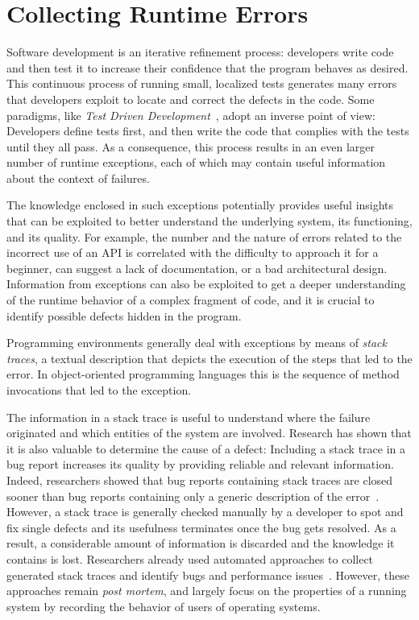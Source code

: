 \section{Collecting Runtime Errors} \label{sec:stacktraces-intro}

Software development is an iterative refinement process: developers write code and then test it to increase their confidence that the program behaves as desired.
This continuous process of running small, localized tests generates many errors that developers exploit to locate and correct the defects in the code.
Some paradigms, like \emph{Test Driven Development}~\cite{BeckTDD}, adopt an inverse point of view: Developers define tests first, and then write the code that complies with the tests until they all pass.
As a consequence, this process results in an even larger number of runtime exceptions, each of which may contain useful information about the context of failures.

The knowledge enclosed in such exceptions potentially provides useful insights that can be exploited to better understand the underlying system, its functioning, and its quality.
For example, the number and the nature of errors related to the incorrect use of an API is correlated with the difficulty to approach it for a beginner, can suggest a lack of documentation, or a bad architectural design.
Information from exceptions can also be exploited to get a deeper understanding of the runtime behavior of a complex fragment of code, and it is crucial to identify possible defects hidden in the program.

Programming environments generally deal with exceptions by means of \emph{stack traces}, a textual description that depicts the execution of the steps that led to the error.
In object-oriented programming languages this is the sequence of method invocations that led to the exception.

The information in a stack trace is useful to understand where the failure originated and which entities of the system are involved.
Research has shown that it is also valuable to determine the cause of a defect: Including a stack trace in a bug report increases its quality by providing reliable and relevant information.
Indeed, researchers showed that bug reports containing stack traces are closed sooner than bug reports containing only a generic description of the error~\cite{Zimm2010a,Schr2010a}.
However, a stack trace is generally checked manually by a developer to spot and fix single defects and its usefulness terminates once the bug gets resolved.
As a result, a considerable amount of information is discarded and the knowledge it contains is lost.
Researchers already used automated approaches to collect generated stack traces and identify bugs and performance issues~\cite{Glerum2009,Han2012}.
However, these approaches remain \emph{post mortem}, and largely focus on the properties of a running system by recording the behavior of users of operating systems.

